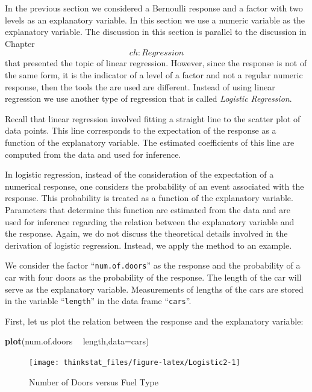 \documentclass[]{krantz}
\makeatletter
\newenvironment{Shaded}{\begin{snugshade}}{\end{snugshade}}
\newcommand{\KeywordTok}[1]{\textcolor[rgb]{0.13,0.29,0.53}{\textbf{#1}}}
\newcommand{\DataTypeTok}[1]{\textcolor[rgb]{0.13,0.29,0.53}{#1}}
\newcommand{\StringTok}[1]{\textcolor[rgb]{0.31,0.60,0.02}{#1}}
\newcommand{\OperatorTok}[1]{\textcolor[rgb]{0.81,0.36,0.00}{\textbf{#1}}}
\newcommand{\NormalTok}[1]{#1}
\newenvironment{kframe}{%
\medskip{}
\setlength{\fboxsep}{.8em}
 \def\at@end@of@kframe{}%
 \ifinner\ifhmode%
  \def\at@end@of@kframe{\end{minipage}}%
  \begin{minipage}{\columnwidth}%
 \fi\fi%
 \def\FrameCommand##1{\hskip\@totalleftmargin \hskip-\fboxsep
 \colorbox{shadecolor}{##1}\hskip-\fboxsep
     \hskip-\linewidth \hskip-\@totalleftmargin \hskip\columnwidth}%
 \MakeFramed {\advance\hsize-\width
   \@totalleftmargin\z@ \linewidth\hsize
   \@setminipage}}%
 {\par\unskip\endMakeFramed%
 \at@end@of@kframe}
\renewenvironment{Shaded}{\begin{kframe}}{\end{kframe}}
\theoremstyle{definition}
\theoremstyle{definition}
\theoremstyle{definition}
\theoremstyle{remark}
\makeatother
\begin{document}
In the previous section we considered a Bernoulli response and a factor
with two levels as an explanatory variable. In this section we use a
numeric variable as the explanatory variable. The discussion in this
section is parallel to the discussion in Chapter~\[ch:Regression\] that
presented the topic of linear regression. However, since the response is
not of the same form, it is the indicator of a level of a factor and not
a regular numeric response, then the tools the are used are different.
Instead of using linear regression we use another type of regression
that is called \emph{Logistic Regression}.

Recall that linear regression involved fitting a straight line to the
scatter plot of data points. This line corresponds to the expectation of
the response as a function of the explanatory variable. The estimated
coefficients of this line are computed from the data and used for
inference.

In logistic regression, instead of the consideration of the expectation
of a numerical response, one considers the probability of an event
associated with the response. This probability is treated as a function
of the explanatory variable. Parameters that determine this function are
estimated from the data and are used for inference regarding the
relation between the explanatory variable and the response. Again, we do
not discuss the theoretical details involved in the derivation of
logistic regression. Instead, we apply the method to an example.

We consider the factor ``\texttt{num.of.doors}'' as the response and the
probability of a car with four doors as the probability of the response.
The length of the car will serve as the explanatory variable.
Measurements of lengths of the cars are stored in the variable
``\texttt{length}'' in the data frame ``\texttt{cars}''.

First, let us plot the relation between the response and the explanatory
variable:

\begin{Shaded}
\begin{Highlighting}[]
\KeywordTok{plot}\NormalTok{(num.of.doors }\OperatorTok{~}\StringTok{ }\NormalTok{length,}\DataTypeTok{data=}\NormalTok{cars)}
\end{Highlighting}
\end{Shaded}

\begin{figure}

{\centering \texttt{[image: thinkstat\_files/figure-latex/Logistic2-1]} 

}

\caption{Number of Doors versus Fuel Type}\label{fig:Logistic2}
\end{figure}
\end{document}
